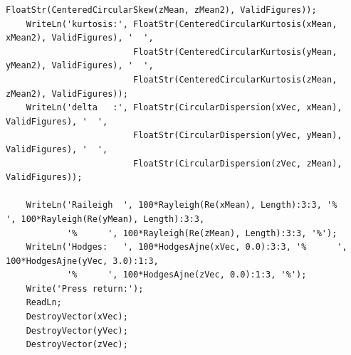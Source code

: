 \begin{refsection}
\begin{lstlisting}[caption=Test program]
                         FloatStr(CenteredCircularSkew(zMean, zMean2), ValidFigures));
    WriteLn('kurtosis:', FloatStr(CenteredCircularKurtosis(xMean, xMean2), ValidFigures), '  ',
                         FloatStr(CenteredCircularKurtosis(yMean, yMean2), ValidFigures), '  ',
                         FloatStr(CenteredCircularKurtosis(zMean, zMean2), ValidFigures));
    WriteLn('delta   :', FloatStr(CircularDispersion(xVec, xMean), ValidFigures), '  ',
                         FloatStr(CircularDispersion(yVec, yMean), ValidFigures), '  ',
                         FloatStr(CircularDispersion(zVec, zMean), ValidFigures));

    WriteLn('Raileigh  ', 100*Rayleigh(Re(xMean), Length):3:3, '%      ', 100*Rayleigh(Re(yMean), Length):3:3,
            '%      ', 100*Rayleigh(Re(zMean), Length):3:3, '%');
    WriteLn('Hodges:   ', 100*HodgesAjne(xVec, 0.0):3:3, '%      ', 100*HodgesAjne(yVec, 3.0):1:3,
            '%      ', 100*HodgesAjne(zVec, 0.0):1:3, '%');
    Write('Press return:');
    ReadLn;
    DestroyVector(xVec);
    DestroyVector(yVec);
    DestroyVector(zVec);
  \end{lstlisting}

\printbibliography[heading=subbibliography]
\end{refsection}

